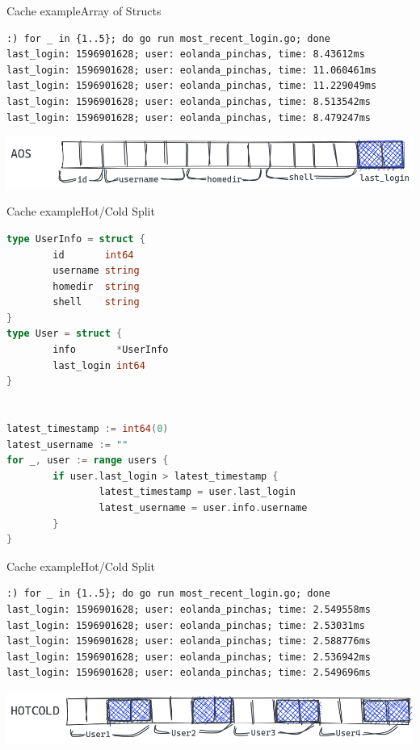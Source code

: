 \documentclass[10pt,xcolor=dvipsnames]{beamer}
\begin{document}
\begin{frame}[fragile]{Cache example}{Array of Structs}
  \begin{lstlisting}
:) for _ in {1..5}; do go run most_recent_login.go; done
last_login: 1596901628; user: eolanda_pinchas, time: 8.43612ms
last_login: 1596901628; user: eolanda_pinchas, time: 11.060461ms
last_login: 1596901628; user: eolanda_pinchas, time: 11.229049ms
last_login: 1596901628; user: eolanda_pinchas, time: 8.513542ms
last_login: 1596901628; user: eolanda_pinchas, time: 8.479247ms
\end{lstlisting}
\vskip 1.5cm
\centering\includegraphics[scale=0.3]{aos.png}
\end{frame}

\begin{frame}[fragile]{Cache example}{Hot/Cold Split}
  \begin{lstlisting}[language = Go]
type UserInfo = struct {
        id       int64
        username string
        homedir  string
        shell    string
}
type User = struct {
        info       *UserInfo
        last_login int64
}


latest_timestamp := int64(0)
latest_username := ""
for _, user := range users {
        if user.last_login > latest_timestamp {
                latest_timestamp = user.last_login
                latest_username = user.info.username
        }
}
  \end{lstlisting}
\end{frame}

\begin{frame}[fragile]{Cache example}{Hot/Cold Split}
  \begin{lstlisting}
:) for _ in {1..5}; do go run most_recent_login.go; done
last_login: 1596901628; user: eolanda_pinchas; time: 2.549558ms
last_login: 1596901628; user: eolanda_pinchas; time: 2.53031ms
last_login: 1596901628; user: eolanda_pinchas; time: 2.588776ms
last_login: 1596901628; user: eolanda_pinchas; time: 2.536942ms
last_login: 1596901628; user: eolanda_pinchas; time: 2.549696ms
\end{lstlisting}
\vskip 1.5cm
\centering\includegraphics[scale=0.3]{hotcold.png}
\end{frame}
\end{document}
